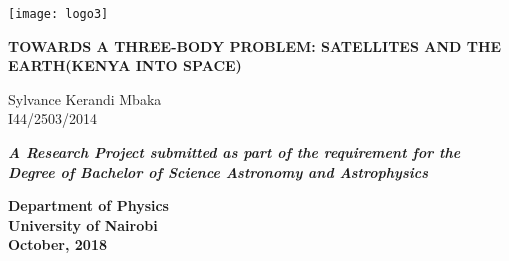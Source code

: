 \begin{titlepage}
    \begin{center}
    	\texttt{[image: logo3]}
        \vspace*{1cm}
        
        \huge
        \textbf{TOWARDS A THREE-BODY PROBLEM: SATELLITES AND THE EARTH(KENYA INTO SPACE)}
        
        \vspace{0.5cm}
        
        \vspace{1.5cm}
        
        \Large
        Sylvance Kerandi Mbaka\\
        I44/2503/2014
        
        \vfill
        \large
        \textbf{\textit{A Research Project submitted as part of the requirement for the
        	Degree of Bachelor of Science Astronomy and Astrophysics}}
        
        
        \vspace{0.8cm}
        
        \large
        \textbf{Department of Physics}\\
        \textbf{University of Nairobi}\\
        \vspace{0.5cm}
        \textbf{October, 2018}
        
        
    \end{center}
\end{titlepage}